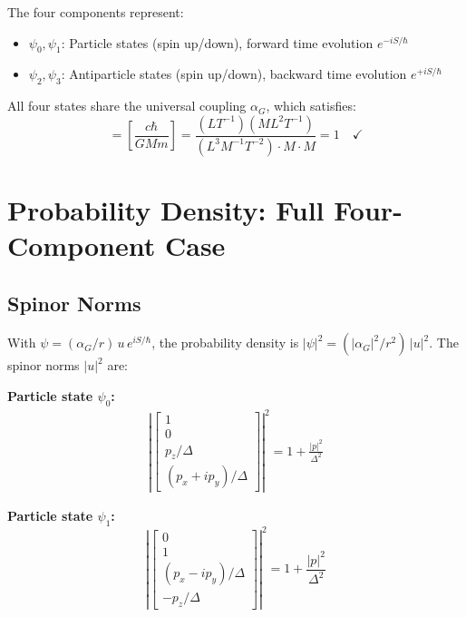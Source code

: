 \documentclass[11pt,a4paper]{article}
\theoremstyle{definition}
\theoremstyle{remark}
\begin{document}
	The four components represent:
	\begin{itemize}
		\item $\psi_0,\psi_1$: Particle states (spin up/down), forward time evolution $e^{-iS/\hbar}$
		\item $\psi_2,\psi_3$: Antiparticle states (spin up/down), backward time evolution $e^{+iS/\hbar}$
	\end{itemize}
	
	All four states share the universal coupling $\alpha_G$, which satisfies:
	\begin{equation}
		[\alpha_G^2] = \left[\frac{c\hbar}{GMm}\right] = \frac{(LT^{-1})(ML^2T^{-1})}{(L^3M^{-1}T^{-2})\cdot M\cdot M} = 1 \quad\checkmark
	\end{equation}
	
	\section{Probability Density: Full Four-Component Case}
	
	\subsection{Spinor Norms}
	
	With $\psi = (\alpha_G/r)\,u\,e^{iS/\hbar}$, the probability density is $|\psi|^2 = (|\alpha_G|^2/r^2)\,|u|^2$.  The spinor norms $|u|^2$ are:
	
	\textbf{Particle state $\psi_0$:}
	\begin{align}
		\left|\begin{bmatrix}1\\0\\ p_z/\Delta\\ (p_x+ip_y)/\Delta\end{bmatrix}\right|^2
		= 1 + \frac{|p|^2}{\Delta^2}
		\label{eq:norm_psi0}
	\end{align}
	
	\textbf{Particle state $\psi_1$:}
	\begin{equation}
		\left|\begin{bmatrix}0\\1\\ (p_x-ip_y)/\Delta\\ -p_z/\Delta\end{bmatrix}\right|^2 = 1 + \frac{|p|^2}{\Delta^2}
		\label{eq:norm_psi1}
	\end{equation}
	
\end{document}
